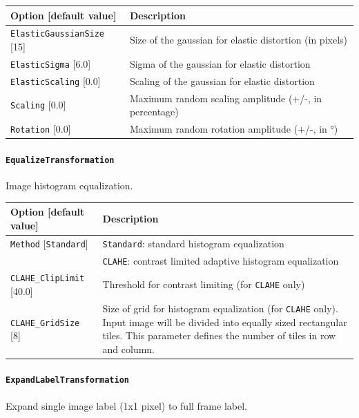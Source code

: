\documentclass[a4paper,11pt,oneside]{article}
\newcommand{\iponly}{\reversemarginpar
    \marginnote{\color{listletiblue}\normalfont\scriptsize
    {\ttfamily{}\hyperref[sec:N2D2-IP]{\color{listletiblue}N2D2 IP}} \emph{only}}}
\begin{document}
\begin{center}
 \begin{tabular}{| p{5cm} | p{10cm} | }
 \hline
 Option [default value] & Description\\
 \hline\hline
  \lstinline!ElasticGaussianSize! [15] & Size of the gaussian for elastic
  distortion (in pixels) \\
  \lstinline!ElasticSigma! [6.0] & Sigma of the gaussian for elastic
  distortion \\
  \lstinline!ElasticScaling! [0.0] & Scaling of the gaussian for elastic
  distortion \\
  \lstinline!Scaling! [0.0] & Maximum random scaling amplitude
  (+/-, in percentage) \\
  \lstinline!Rotation! [0.0] & Maximum random rotation amplitude
  (+/-, in °) \\
 \hline
\end{tabular}
\end{center}

\paragraph{\texorpdfstring{%
\lstinline[basicstyle=\ttfamily\bfseries]!EqualizeTransformation!%
\protect\iponly}{EqualizeTransformation}}
Image histogram equalization.

\begin{center}
 \begin{tabular}{| p{5cm} | p{10cm} | }
 \hline
 Option [default value] & Description\\
 \hline\hline
  \lstinline!Method! [\lstinline!Standard!] & \lstinline!Standard!: standard
  histogram equalization \\
   & \lstinline!CLAHE!: contrast limited adaptive histogram equalization \\
  \lstinline!CLAHE_ClipLimit! [40.0] & Threshold for contrast limiting
  (for \lstinline!CLAHE! only) \\
  \lstinline!CLAHE_GridSize! [8] & Size of grid for histogram equalization
   (for \lstinline!CLAHE! only).
  Input image will be divided into equally sized rectangular tiles.
  This parameter defines the number of tiles in row and column. \\
 \hline
\end{tabular}
\end{center}


\paragraph{\texorpdfstring{%
\lstinline[basicstyle=\ttfamily\bfseries]!ExpandLabelTransformation!%
\protect\iponly}{ExpandLabelTransformation}}
Expand single image label (1x1 pixel) to full frame label.
\end{document}
